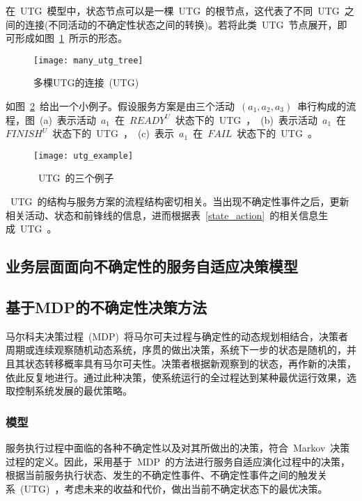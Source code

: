 在~UTG~模型中，状态节点可以是一棵~UTG~的根节点，这代表了不同~UTG~之间的连接(不同活动的不确定性状态之间的转换)。若将此类~UTG~节点展开，即可形成如图~\ref{many_utg_tree}~所示的形态。

\begin{figure}[htbp]
    \centering
    \texttt{[image: many\_utg\_tree]}
    \caption{多棵UTG的连接~(UTG)~}\label{many_utg_tree}
    \vspace{-1em}
\end{figure}

如图~\ref{utg_example}~给出一个小例子。假设服务方案是由三个活动~$(a_1, a_2, a_3)$~串行构成的流程，图~(a)~表示活动~$a_1$~在~$READY^U$~状态下的~UTG~，~(b)~表示活动~$a_1$~在~$FINISH^U$~状态下的~UTG~，~(c)~表示~$a_1$~在~$FAIL$~状态下的~UTG~。

\begin{figure}[htbp]
    \centering
    \texttt{[image: utg\_example]}
    \caption{~UTG~的三个例子}\label{utg_example}
    \vspace{-1em}
\end{figure}

~UTG~的结构与服务方案的流程结构密切相关。当出现不确定性事件之后，更新相关活动、状态和前锋线的信息，进而根据表~\ref{state_action}~的相关信息生成~UTG~。

\subsection{业务层面面向不确定性的服务自适应决策模型}




\subsection{基于MDP的不确定性决策方法}
马尔科夫决策过程~(MDP)~将马尔可夫过程与确定性的动态规划相结合，决策者周期或连续观察随机动态系统，序贯的做出决策，系统下一步的状态是随机的，并且其状态转移概率具有马尔可夫性。决策者根据新观察到的状态，再作新的决策，依此反复地进行。通过此种决策，使系统运行的全过程达到某种最优运行效果，选取控制系统发展的最优策略。

\subsubsection{模型}

服务执行过程中面临的各种不确定性以及对其所做出的决策，符合~Markov~决策过程的定义。因此，采用基于~MDP~的方法进行服务自适应演化过程中的决策，根据当前服务执行状态、发生的不确定性事件、不确定性事件之间的触发关系~(UTG)~，考虑未来的收益和代价，做出当前不确定状态下的最优决策。

